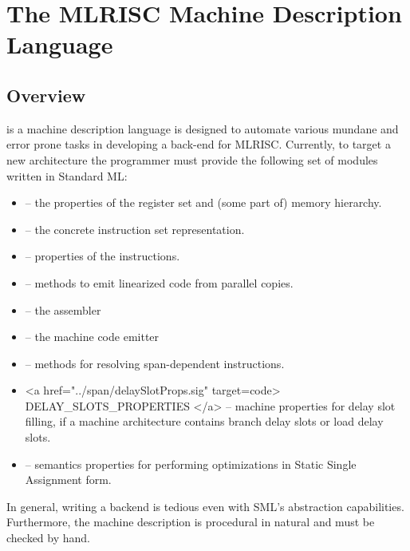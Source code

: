 \section{The MLRISC Machine Description Language}

\subsection{ Overview }

 is a machine description language 
is designed to automate
various mundane and error prone tasks in developing a back-end for 
MLRISC.  Currently, to target a new
architecture the programmer must provide the following set of modules
written in Standard ML:

\begin{itemize}
  \item {} -- 
   the properties of the register set and (some part of) memory hierarchy. 
  \item {} -- 
   the concrete instruction set representation.
  \item {}  --
   properties of the instructions.
  \item {} --
   methods to emit linearized code from parallel copies.
  \item {} --
   the assembler
  \item {} --
   the machine code emitter
  \item {} --
   methods for resolving span-dependent instructions. 
  \item <a href="../span/delaySlotProps.sig" target=code> DELAY_SLOTS_PROPERTIES 
        </a> -- machine properties for delay slot filling, if a machine 
    architecture contains branch delay slots or load delay slots.
  \item {} --
    semantics properties for performing optimizations in Static Single
  Assignment form.
\end{itemize}

In general, writing a backend is tedious even with  
SML's abstraction capabilities. 
Furthermore, the machine description is procedural in natural 
and must be checked by hand.  

